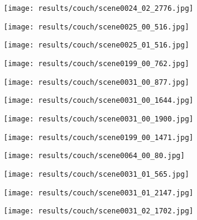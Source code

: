 \begin{figure}[h!]
  \centering
  \begin{subfigure}[b]{0.32\linewidth}
    \texttt{[image: results/couch/scene0024\_02\_2776.jpg]}
  \end{subfigure}
  \begin{subfigure}[b]{0.32\linewidth}
    \texttt{[image: results/couch/scene0025\_00\_516.jpg]}
  \end{subfigure}
  \begin{subfigure}[b]{0.32\linewidth}
    \texttt{[image: results/couch/scene0025\_01\_516.jpg]}
  \end{subfigure}
  \begin{subfigure}[b]{0.32\linewidth}
    \texttt{[image: results/couch/scene0199\_00\_762.jpg]}
  \end{subfigure}
  \begin{subfigure}[b]{0.32\linewidth}
    \texttt{[image: results/couch/scene0031\_00\_877.jpg]}
  \end{subfigure}
  \begin{subfigure}[b]{0.32\linewidth}
    \texttt{[image: results/couch/scene0031\_00\_1644.jpg]}
  \end{subfigure}
  \begin{subfigure}[b]{0.32\linewidth}
    \texttt{[image: results/couch/scene0031\_00\_1900.jpg]}
  \end{subfigure}
  \begin{subfigure}[b]{0.32\linewidth}
    \texttt{[image: results/couch/scene0199\_00\_1471.jpg]}
  \end{subfigure}
  \begin{subfigure}[b]{0.32\linewidth}
    \texttt{[image: results/couch/scene0064\_00\_80.jpg]}
  \end{subfigure}
  \begin{subfigure}[b]{0.32\linewidth}
    \texttt{[image: results/couch/scene0031\_01\_565.jpg]}
  \end{subfigure}
  \begin{subfigure}[b]{0.32\linewidth}
    \texttt{[image: results/couch/scene0031\_01\_2147.jpg]}
  \end{subfigure}
  \begin{subfigure}[b]{0.32\linewidth}
    \texttt{[image: results/couch/scene0031\_02\_1702.jpg]}
  \end{subfigure}

\end{figure}
